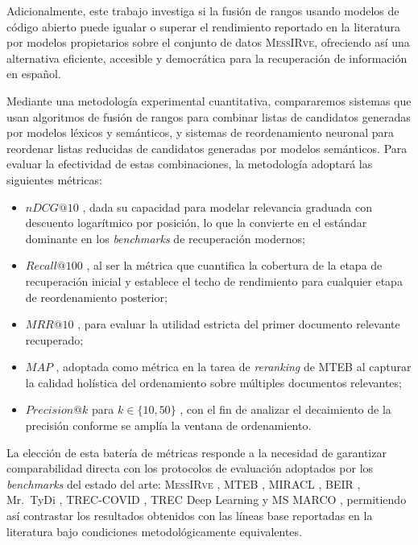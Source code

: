 \documentclass[12pt]{article}
\begin{document}
    Adicionalmente, este trabajo investiga si la fusión de rangos usando modelos de código abierto puede igualar o superar el rendimiento reportado en la literatura por modelos propietarios sobre el conjunto de datos \textsc{MessIRve}, ofreciendo así una alternativa eficiente, accesible y democrática para la recuperación de información en español.
    
	Mediante una metodología experimental cuantitativa, compararemos sistemas que usan algoritmos de fusión de rangos para combinar listas de candidatos generadas por modelos léxicos y semánticos, y sistemas de reordenamiento neuronal para reordenar listas reducidas de candidatos generadas por modelos semánticos. Para evaluar la efectividad de estas combinaciones, la metodología adoptará las siguientes métricas:
	\begin{itemize}
		\item $nDCG@10$ \parencite{valentini-etal-2025-messirve,muennighoff2023mteb,zhang2023miracl,thakur2021beirheterogenousbenchmarkzeroshot,craswell2020overview}, dada su capacidad para modelar relevancia graduada con descuento logarítmico por posición, lo que la convierte en el estándar dominante en los \textit{benchmarks} de recuperación modernos;
		\item $Recall@100$ \parencite{valentini-etal-2025-messirve,zhang2023miracl,zhang2021mrtydi}, al ser la métrica que cuantifica la cobertura de la etapa de recuperación inicial y establece el techo de rendimiento para cualquier etapa de reordenamiento posterior;
		\item $MRR@10$ \parencite{zhang2021mrtydi,nguyen2016msmarco}, para evaluar la utilidad estricta del primer documento relevante recuperado;
		\item $MAP$ \parencite{muennighoff2023mteb}, adoptada como métrica en la tarea de \textit{reranking} de MTEB al capturar la calidad holística del ordenamiento sobre múltiples documentos relevantes;
		\item $Precision@k$ para $k \in \{10, 50\}$ \parencite{voorhees2021treccovid,craswell2020overview}, con el fin de analizar el decaimiento de la precisión conforme se amplía la ventana de ordenamiento.
	\end{itemize}
	La elección de esta batería de métricas responde a la necesidad de garantizar comparabilidad directa con los protocolos de evaluación adoptados por los \textit{benchmarks} del estado del arte: \textsc{MessIRve} \parencite{valentini-etal-2025-messirve}, MTEB \parencite{muennighoff2023mteb}, MIRACL \parencite{zhang2023miracl}, BEIR \parencite{thakur2021beirheterogenousbenchmarkzeroshot}, Mr.\ TyDi \parencite{zhang2021mrtydi}, TREC-COVID \parencite{voorhees2021treccovid}, TREC Deep Learning \parencite{craswell2020overview} y MS MARCO \parencite{nguyen2016msmarco}, permitiendo así contrastar los resultados obtenidos con las líneas base reportadas en la literatura bajo condiciones metodológicamente equivalentes.
	
\end{document}
